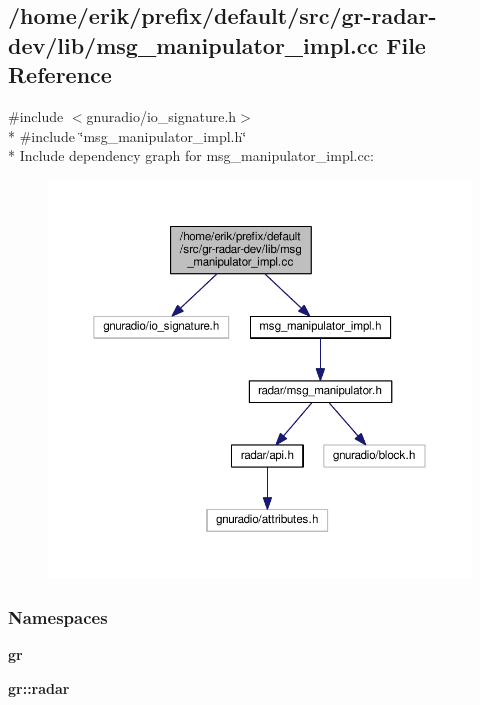 \subsection{/home/erik/prefix/default/src/gr-\/radar-\/dev/lib/msg\+\_\+manipulator\+\_\+impl.cc File Reference}
\label{msg__manipulator__impl_8cc}
{\ttfamily \#include $<$gnuradio/io\+\_\+signature.\+h$>$}\\*
{\ttfamily \#include \char`\"{}msg\+\_\+manipulator\+\_\+impl.\+h\char`\"{}}\\*
Include dependency graph for msg\+\_\+manipulator\+\_\+impl.\+cc\+:
\nopagebreak
\begin{figure}[H]
\begin{center}
\leavevmode
\includegraphics[width=350pt]{d7/def/msg__manipulator__impl_8cc__incl}
\end{center}
\end{figure}
\subsubsection*{Namespaces}
\begin{DoxyCompactItemize}
\item 
 {\bf gr}
\item 
 {\bf gr\+::radar}
\end{DoxyCompactItemize}
